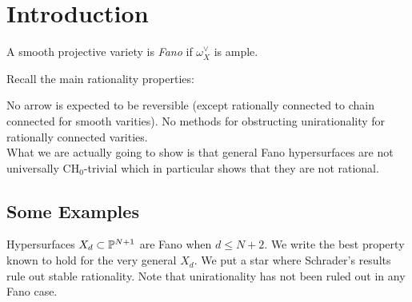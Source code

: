 \documentclass[12pt]{article}
\begin{document}
\section{Introduction}

\begin{defn}
A smooth projective variety is \textit{Fano} if $\omega_X^\vee$ is ample.
\end{defn}

Recall the main rationality properties:

\begin{center}
\end{center}

No arrow is expected to be reversible (except rationally connected to chain connected for smooth varities). No methods for obstructing unirationality for rationally connected varities.
\bigskip\\
What we are actually going to show is that general Fano hypersurfaces are not universally $\mathrm{CH}_0$-trivial which in particular shows that they are not rational.

\subsection{Some Examples}

Hypersurfaces $X_d \subset \P^{N+1}$ are Fano when $d \le N+2$. We write the best property known to hold for the very general $X_d$. We put a star where Schrader's results rule out stable rationality. Note that unirationality has not been ruled out in any Fano case.
\bigskip\\
\end{document}
